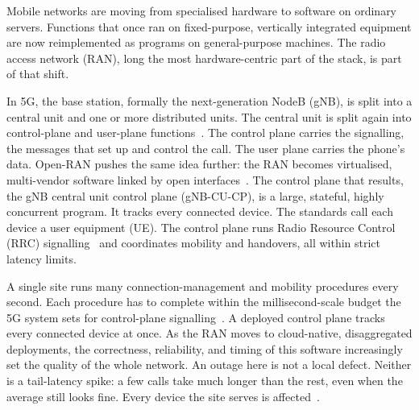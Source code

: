 \documentclass[english,oneside,a4paper,censored,csm,software-track-2020]{HYthesisML}
\begin{document}
Mobile networks are moving from specialised hardware to software on ordinary servers.
Functions that once ran on fixed-purpose, vertically integrated equipment are now
reimplemented as programs on general-purpose machines. The radio access network (RAN),
long the most hardware-centric part of the stack, is part of that shift.

In 5G, the base station, formally the next-generation NodeB (gNB), is split into a central
unit and one or more distributed units. The central unit is split again into control-plane
and user-plane functions~\cite{3gpp38401,3gpp38300}. The control plane carries the signalling, the messages that set up and control
the call. The user plane carries the phone’s data. Open-RAN pushes the same idea further:
the RAN becomes virtualised, multi-vendor software linked by open
interfaces~\cite{polese2023oran}. The control plane that results, the gNB central unit
control plane (gNB-CU-CP), is a large, stateful, highly concurrent program. It tracks every
connected device. The standards call each device a user equipment (UE). The control plane runs
Radio Resource Control (RRC) signalling~\cite{3gpp38331} and coordinates mobility and
handovers, all within strict latency limits.

A single site runs many connection-management and
mobility procedures every second. Each procedure has to complete within the millisecond-scale
budget the 5G system sets for control-plane signalling~\cite{3gpp38913}. A deployed control plane tracks every connected
device at once. As the RAN moves to cloud-native, disaggregated deployments, the
correctness, reliability, and timing of this software increasingly set the quality of the
whole network. An outage here is not a local defect. Neither is a tail-latency
spike: a few calls take much longer than the rest, even when the average still
looks fine. Every device the site serves is
affected~\cite{dean2013tail,barroso2017microseconds}.
\end{document}
